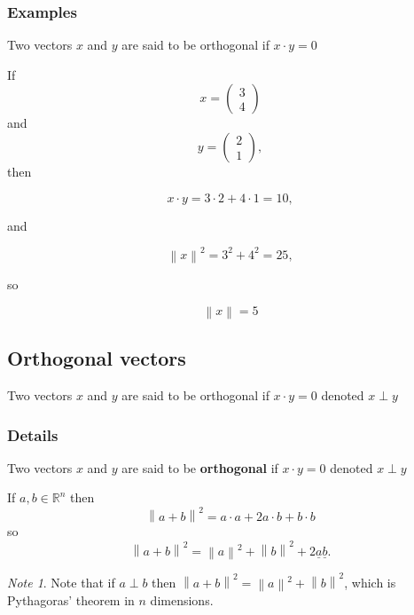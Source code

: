 \documentclass[12pt,a4paper]{article}
\theoremstyle{regla}
\theoremstyle{remark}
\newtheorem{notes}{Note}[section]
\theoremstyle{definition}
\theoremstyle{nonumberbreak}
\begin{document}
\subsubsection{Examples}
Two vectors $x$ and $y$ are said to be orthogonal if $x \cdot y = 0$

\begin{xmpl}

If 
$$x= \begin{pmatrix}
3\\
4
\end{pmatrix}$$
 and 
$$y= \begin{pmatrix}
2\\
1
\end{pmatrix},$$
then

$$x \cdot y = 3 \cdot 2 + 4 \cdot 1 = 10,$$

and

$$\left \| x \right \|^2 = 3^2 + 4^2 = 25,$$

so

$$\left\| x \right \| = 5$$

\end{xmpl}

\subsection{Orthogonal vectors}
\begin{fbox}
\begin{minipage}{0.97\textwidth}
Two vectors $x$ and $y$ are said to be orthogonal if $x\cdot y=0$ denoted $x \perp y$
\end{minipage}
\end{fbox}
\subsubsection{Details}
\begin{defn}
Two vectors $x$ and $y$ are said to be {\bf orthogonal} if $x\cdot y=0$ denoted $x \perp y$
\end{defn}

If $a,b \in \mathbb{R}^n$ then 
$$\left\|a+b\right\|^2=a\cdot a+2a\cdot b+b\cdot b$$
so 
$$\left\|a+b\right\|^2=\left\|a\right\|^2+\left\|b\right\|^2 + 2\underline{a}\underline{b}.$$
\begin{notes}
Note that if $a \perp b$ then $\left\|a+b\right\|^2=\left\|a\right\|^2+ \left\|b\right\|^2$, which is Pythagoras' theorem in $n$ dimensions.
\end{notes}
\end{document}
